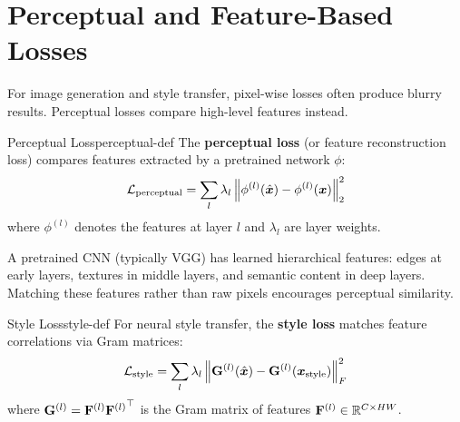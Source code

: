 \documentclass[../../main.tex]{subfiles}
\begin{document}
\section{Perceptual and Feature-Based Losses}
\label{sec:perceptual-losses}

For image generation and style transfer, pixel-wise losses often produce blurry results. Perceptual losses compare high-level features instead.

\begin{definition}{Perceptual Loss}{perceptual-def}
The \textbf{perceptual loss} (or feature reconstruction loss) compares features extracted by a pretrained network $\phi$:
\[
    \mathcal{L}_{\text{perceptual}} = \sum_{l} \lambda_l \left\lVert \phi^{(l)}(\hat{\boldsymbol{x}}) - \phi^{(l)}(\boldsymbol{x}) \right\rVert_2^2
\]
where $\phi^{(l)}$ denotes the features at layer $l$ and $\lambda_l$ are layer weights.
\end{definition}

\begin{intuition}
A pretrained CNN (typically VGG) has learned hierarchical features: edges at early layers, textures in middle layers, and semantic content in deep layers. Matching these features rather than raw pixels encourages perceptual similarity.
\end{intuition}

\begin{definition}{Style Loss}{style-def}
For neural style transfer, the \textbf{style loss} matches feature correlations via Gram matrices:
\[
    \mathcal{L}_{\text{style}} = \sum_{l} \lambda_l \left\lVert \mathbf{G}^{(l)}(\hat{\boldsymbol{x}}) - \mathbf{G}^{(l)}(\boldsymbol{x}_{\text{style}}) \right\rVert_F^2
\]
where $\mathbf{G}^{(l)} = \mathbf{F}^{(l)} {\mathbf{F}^{(l)}}^\top$ is the Gram matrix of features $\mathbf{F}^{(l)} \in \mathbb{R}^{C \times HW}$.
\end{definition}
\end{document}
